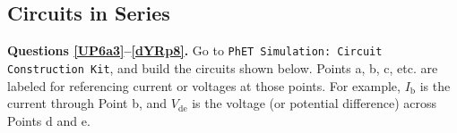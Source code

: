 \documentclass[]{exam}
\begin{document}
\begin{questions}
\end{questions}

\clearpage

\subsection*{Circuits in Series}

\noindent \textbf{Questions \ref{UP6a3}--\ref{dYRp8}.} Go to \texttt{PhET Simulation: Circuit Construction Kit}, and build the circuits shown below. Points a, b, c, etc. are labeled for referencing current or voltages at those points. For example, $I_\mathrm{b}$ is the current through Point b, and $V_\mathrm{de}$ is the voltage (or potential difference) across Points d and e.
\end{document}

